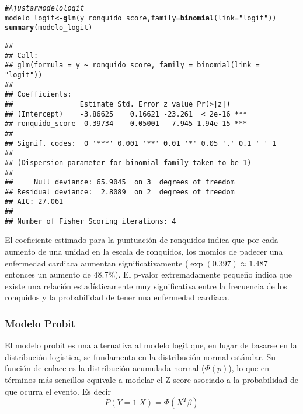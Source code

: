 \documentclass[paper=letter, fontsize=11pt]{scrartcl}\usepackage[]{graphicx}\usepackage[]{xcolor}
\makeatletter
\newcommand{\hlsng}[1]{\textcolor[rgb]{0.192,0.494,0.8}{#1}}%
\newcommand{\hlcom}[1]{\textcolor[rgb]{0.678,0.584,0.686}{\textit{#1}}}%
\newcommand{\hlopt}[1]{\textcolor[rgb]{0,0,0}{#1}}%
\newcommand{\hldef}[1]{\textcolor[rgb]{0.345,0.345,0.345}{#1}}%
\newcommand{\hlkwb}[1]{\textcolor[rgb]{0.69,0.353,0.396}{#1}}%
\newcommand{\hlkwc}[1]{\textcolor[rgb]{0.333,0.667,0.333}{#1}}%
\newcommand{\hlkwd}[1]{\textcolor[rgb]{0.737,0.353,0.396}{\textbf{#1}}}%
\newenvironment{kframe}{%
 \def\at@end@of@kframe{}%
 \ifinner\ifhmode%
  \def\at@end@of@kframe{\end{minipage}}%
  \begin{minipage}{\columnwidth}%
 \fi\fi%
 \def\FrameCommand##1{\hskip\@totalleftmargin \hskip-\fboxsep
 \colorbox{shadecolor}{##1}\hskip-\fboxsep
     \hskip-\linewidth \hskip-\@totalleftmargin \hskip\columnwidth}%
 \MakeFramed {\advance\hsize-\width
   \@totalleftmargin\z@ \linewidth\hsize
   \@setminipage}}%
 {\par\unskip\endMakeFramed%
 \at@end@of@kframe}
\newenvironment{knitrout}{}{} %
\numberwithin{equation}{problemcounter} %
\numberwithin{figure}{problemcounter} %
\numberwithin{table}{problemcounter} %
\numberwithin{subsection}{problemcounter}
\makeatother
\begin{document}
\begin{knitrout}
\color{fgcolor}\begin{kframe}
\begin{alltt}
\hlcom{# Ajustar modelo logit}
\hldef{modelo_logit} \hlkwb{<-} \hlkwd{glm}\hldef{(y} \hlopt{~} \hldef{ronquido_score,} \hlkwc{family} \hldef{=} \hlkwd{binomial}\hldef{(}\hlkwc{link} \hldef{=} \hlsng{"logit"}\hldef{))}
\hlkwd{summary}\hldef{(modelo_logit)}
\end{alltt}
\begin{verbatim}
## 
## Call:
## glm(formula = y ~ ronquido_score, family = binomial(link = "logit"))
## 
## Coefficients:
##                Estimate Std. Error z value Pr(>|z|)    
## (Intercept)    -3.86625    0.16621 -23.261  < 2e-16 ***
## ronquido_score  0.39734    0.05001   7.945 1.94e-15 ***
## ---
## Signif. codes:  0 '***' 0.001 '**' 0.01 '*' 0.05 '.' 0.1 ' ' 1
## 
## (Dispersion parameter for binomial family taken to be 1)
## 
##     Null deviance: 65.9045  on 3  degrees of freedom
## Residual deviance:  2.8089  on 2  degrees of freedom
## AIC: 27.061
## 
## Number of Fisher Scoring iterations: 4
\end{verbatim}
\end{kframe}
\end{knitrout}

El coeficiente estimado para la puntuación de ronquidos indica que por cada aumento de una unidad en la escala de ronquidos, los momios de padecer una enfermedad cardiaca aumentan significativamente ($\exp(0.397) \approx 1.487$ entonces un aumento de 48.7\%). El p-valor extremadamente pequeño indica que existe una relación estadísticamente muy significativa entre la frecuencia de los ronquidos y la probabilidad de tener una enfermedad cardíaca.

\subsubsection*{Modelo Probit}

El modelo probit es una alternativa al modelo logit que, en lugar de basarse en la distribución logística, se fundamenta en la distribución normal estándar. Su función de enlace es la distribución acumulada normal ($\Phi(p)$), lo que en términos más sencillos equivale a modelar el Z-score asociado a la probabilidad de que ocurra el evento. Es decir
$$P(Y=1|X) = \Phi(X^T\beta)$$
\end{document}
